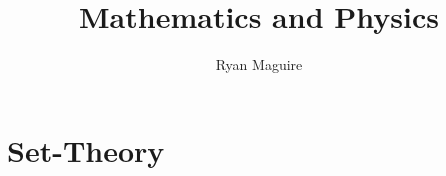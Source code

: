 \documentclass[oneside]{book}                                                  %
\title{Mathematics and Physics}                                                %
\author{Ryan Maguire}                                                          %
\date{\vspace{-5ex}}                                                           %
\newcommand*{\TOPPATH}{books}
\begin{document}
    \maketitle
    \tableofcontents
    \listoffigures
    \listoftables
    \clearpage
        \part{Set-Theory}
            \newcommand{\PATH}{\TOPPATH/Foundations}
            


    
\end{document}
